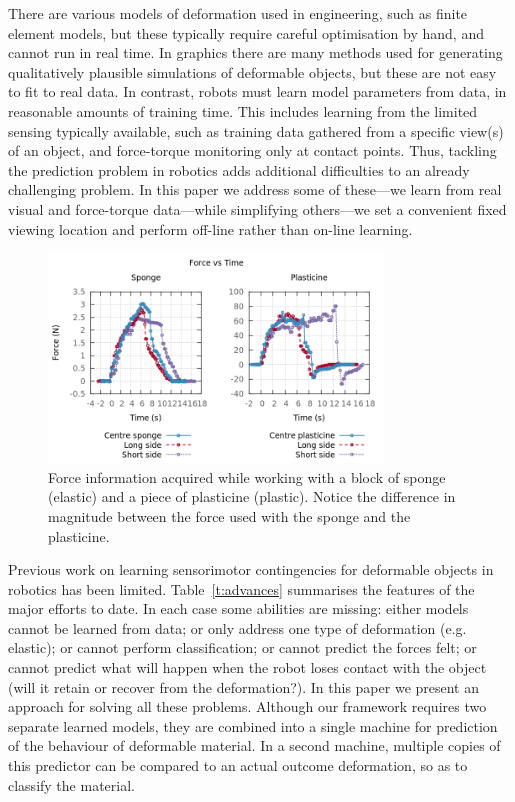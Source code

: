 \documentclass[journal]{IEEEtran}
\newcommand{\comment}[1]{{\color{red} #1}}
\begin{document}
There are various models of deformation used in engineering, such as finite element models, but these typically require careful optimisation by hand, and cannot run in real time. In graphics there are many methods used for generating qualitatively plausible simulations of deformable objects, but these are not easy to fit to real data. \comment{In contrast, robots must learn model parameters from data, in reasonable amounts of training time. This includes learning from the limited sensing typically available, such as training data gathered from a specific view(s) of an object, and force-torque monitoring only at contact points.} Thus, tackling the prediction problem in robotics adds additional difficulties to an already challenging problem. \comment{In this paper we address some of these---we learn from real visual and force-torque data---while simplifying others---we set a convenient fixed viewing location and perform off-line rather than on-line learning.}

\begin{figure}[!t]
\centering\includegraphics[width=3.5in]{arrio17.png}
\caption{Force information acquired while working with a block of sponge (elastic) and a piece of plasticine (plastic).  Notice the difference in magnitude between the force used with the sponge and the plasticine.}
\label{fig:forceElasticPlastic}
\end{figure}

Previous work on learning sensorimotor contingencies for deformable objects in robotics has been limited. Table~\ref{t:advances} summarises the features of the major efforts to date. In each case some abilities are missing: either models cannot be learned from data; or only address one type of deformation (e.g. elastic); or cannot perform classification; or cannot predict the forces felt; or cannot predict what will happen when the robot loses contact with the object (will it retain or recover from the deformation?). In this paper we present an approach for solving all these problems. Although our framework requires two separate learned models, they are combined into a single machine for prediction of the behaviour of deformable material. In a second machine, multiple copies of this predictor can be compared to an actual outcome deformation, so as to classify the material.
\end{document}
